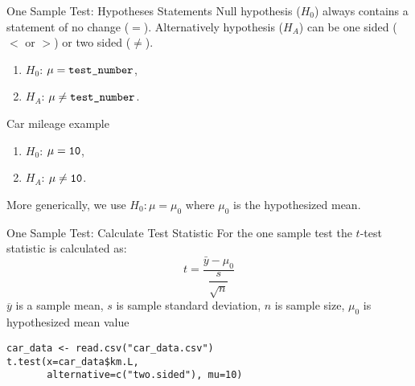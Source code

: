 \documentclass[xcolor=svgnames, 10pt, handout]{beamer}
\begin{document}
\begin{frame}[fragile]{One Sample Test: Hypotheses Statements}
Null hypothesis ($H_0$) always contains a statement of no change ($=$).
\vfill
Alternatively hypothesis ($H_A$) can be one sided ($<$ or $>$) or two sided ($\neq$).
\begin{enumerate}
\item $H_0$: $\mu = \verb|test_number|$,
\item $H_A$: $\mu \neq \verb|test_number|$.
\end{enumerate}
\vfill
Car mileage example
\begin{enumerate}
\item $H_0$: $\mu = \verb|10|$,
\item $H_A$: $\mu \neq \verb|10|$.
\end{enumerate}
More generically, we use $H_0: \mu = \mu_0$ where $\mu_0$ is the hypothesized mean.
\vfill
\end{frame}


\begin{frame}[fragile]{One Sample Test: Calculate Test Statistic}
\vfill
For the one sample test the $t$-test statistic is calculated as:
$$t = \dfrac{\bar y - \mu_0}{\dfrac{s}{\sqrt n}}$$
\vfill
$\overline y$ is a sample mean, $s$ is sample standard deviation, $n$ is sample size, $\mu_0$ is hypothesized mean value
\vfill
\begin{Verbatim}[xleftmargin=2em, xrightmargin=1.5em, frame=single, label=R code, framesep=0.5em]
car_data <- read.csv("car_data.csv")
t.test(x=car_data$km.L,
       alternative=c("two.sided"), mu=10)
\end{Verbatim}
\end{frame}
\end{document}
